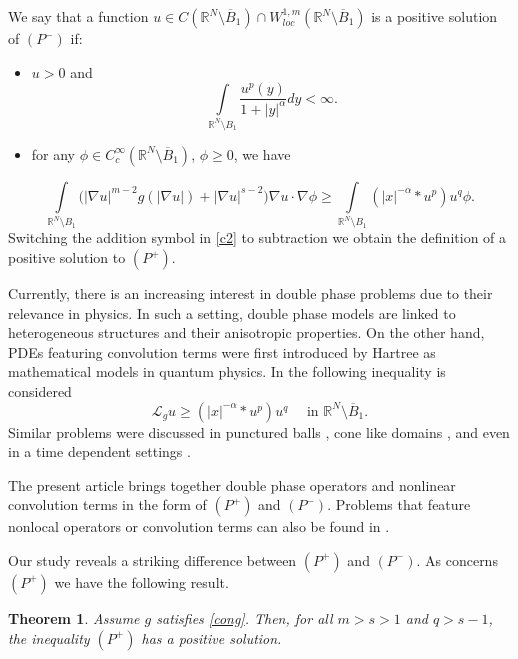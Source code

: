 \documentclass[10pt,a4paper]{amsart}
\numberwithin{equation}{section}
\newcommand{\R}{\mathbb R}
\newcommand{\Ro}{\mathbb R^N\setminus \overline B_1}
\newcommand{\Lg}{{\mathcal L}_g}
\newtheorem{theorem}{Theorem}[section]
\begin{document}
We say that a function $u\in C(\Ro)\cap W_{loc}^{1, m}(\Ro)$ is a positive  solution of $(P^-)$ if:
\begin{itemize}
\item $u>0$ and
\begin{equation}\label{c1}
\int\limits_{\R^N\setminus B_1}\frac{u^{p}(y)}{1+|y|^{\alpha}}dy< \infty.
\end{equation}
\smallskip

\item for any $\phi \in C_{c}^{\infty}(\Ro)$, $\phi\geq 0$, we have
\end{itemize}
\begin{equation}\label{c2}
\int\limits_{\R^N\setminus B_1} \Big(|\nabla u|^{m-2}g(|\nabla u|)+|\nabla u|^{s-2}\Big) \nabla u\cdot \nabla \phi \geq \int\limits_{\R^N\setminus B_1} (|x|^{-\alpha}*u^p)u^q \phi.
\end{equation}
Switching the addition symbol in \eqref{c2} to subtraction  we obtain the definition of a positive solution to $(P^+)$.

Currently, there is an increasing interest in double phase problems \cite{CJJ26, CPR26, TZ26, WS25, Z26, ZLP25} due to their relevance in physics. In such a setting, double phase models are linked to heterogeneous structures and their anisotropic properties. On the other hand, PDEs featuring convolution terms were first introduced by Hartree \cite{Har28a, Har28b, Har28c} as mathematical models in quantum physics. In \cite{GKS20} the following inequality is considered
$$
\Lg u\geq (|x|^{-\alpha}*u^p)u^q\quad\mbox{ in }\R^N\setminus \overline B_1.
$$
Similar problems were discussed in punctured balls \cite{FG20, GZ26}, cone like domains \cite{GZ23},  and even in a time dependent settings \cite{FG22a, FG22b}.

The present article brings together double phase operators and nonlinear convolution terms in the form of $(P^+)$ and $(P^-)$. Problems that feature nonlocal operators or convolution terms can also be found in \cite{LR26, MNV24, NS26}.




 
Our study reveals a striking difference between $(P^+)$ and $(P^-)$. As concerns $(P^+)$ we have the following result.

\begin{theorem}\label{tp}
Assume $g$ satisfies \eqref{cong}. Then, for all $m>s>1$ and $q>s-1$, the inequality $(P^+)$ has a positive solution. 
\end{theorem}
\end{document}
